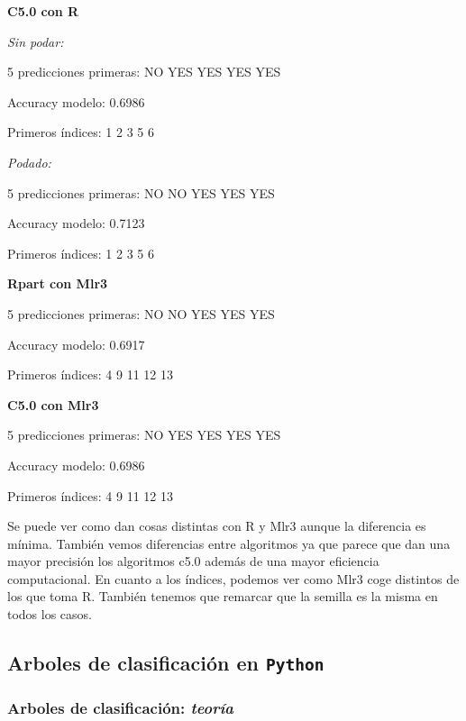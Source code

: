 \documentclass[
  11pt,
  a4paper,
]{article}
\begin{document}
\vspace{0.5cm}

\textbf{C5.0 con R}

\emph{Sin podar:}

5 predicciones primeras: NO YES YES YES YES

Accuracy modelo: 0.6986

Primeros índices: 1 2 3 5 6

\emph{Podado:}

5 predicciones primeras: NO NO YES YES YES

Accuracy modelo: 0.7123

Primeros índices: 1 2 3 5 6

\vspace{0.5cm}

\textbf{Rpart con Mlr3}

5 predicciones primeras: NO NO YES YES YES

Accuracy modelo: 0.6917

Primeros índices: 4 9 11 12 13

\textbf{C5.0 con Mlr3}

5 predicciones primeras: NO YES YES YES YES

Accuracy modelo: 0.6986

Primeros índices: 4 9 11 12 13

\vspace{0.5cm}

Se puede ver como dan cosas distintas con R y Mlr3 aunque la diferencia
es mínima. También vemos diferencias entre algoritmos ya que parece que
dan una mayor precisión los algoritmos c5.0 además de una mayor
eficiencia computacional. En cuanto a los índices, podemos ver como Mlr3
coge distintos de los que toma R. También tenemos que remarcar que la
semilla es la misma en todos los casos.

\newpage

\hypertarget{arboles-de-clasificaciuxf3n-en-python}{%
\subsection{\texorpdfstring{Arboles de clasificación en \texttt{Python}
}{Arboles de clasificación en Python }}\label{arboles-de-clasificaciuxf3n-en-python}}

\hypertarget{arboles-de-clasificaciuxf3n-teoruxeda}{%
\subsubsection{\texorpdfstring{Arboles de clasificación: \emph{teoría}
}{Arboles de clasificación: teoría }}\label{arboles-de-clasificaciuxf3n-teoruxeda}}
\end{document}
